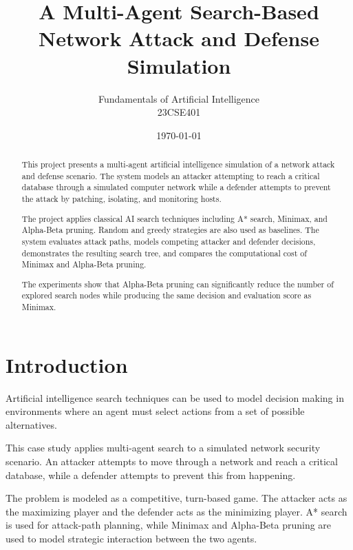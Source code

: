 \documentclass[12pt,a4paper]{article}
\title{
    A Multi-Agent Search-Based Network Attack and Defense Simulation
}
\author{
    Fundamentals of Artificial Intelligence\\
    23CSE401
}
\date{\today}
\begin{document}
\maketitle

\begin{abstract}

This project presents a multi-agent artificial intelligence simulation of a
network attack and defense scenario. The system models an attacker attempting
to reach a critical database through a simulated computer network while a
defender attempts to prevent the attack by patching, isolating, and monitoring
hosts.

The project applies classical AI search techniques including A* search,
Minimax, and Alpha-Beta pruning. Random and greedy strategies are also used as
baselines. The system evaluates attack paths, models competing attacker and
defender decisions, demonstrates the resulting search tree, and compares the
computational cost of Minimax and Alpha-Beta pruning.

The experiments show that Alpha-Beta pruning can significantly reduce the
number of explored search nodes while producing the same decision and
evaluation score as Minimax.

\end{abstract}


\tableofcontents

\newpage


\section{Introduction}

Artificial intelligence search techniques can be used to model decision
making in environments where an agent must select actions from a set of
possible alternatives.

This case study applies multi-agent search to a simulated network security
scenario. An attacker attempts to move through a network and reach a critical
database, while a defender attempts to prevent this from happening.

The problem is modeled as a competitive, turn-based game. The attacker acts
as the maximizing player and the defender acts as the minimizing player.
A* search is used for attack-path planning, while Minimax and Alpha-Beta
pruning are used to model strategic interaction between the two agents.
\end{document}
